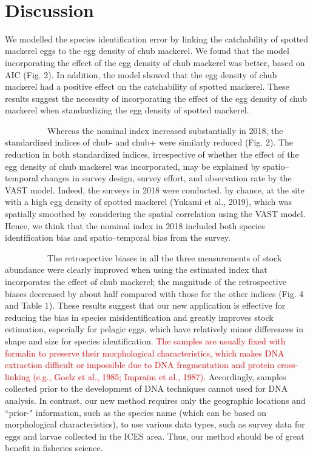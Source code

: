 \documentclass[12pt]{article}
\begin{document}
\begin{linenumbers}
\ \\
\section{Discussion}
We modelled the species identification error by linking the catchability of spotted mackerel eggs to the egg density of chub mackerel. We found that the model incorporating the effect of the egg density of chub mackerel was better, based on AIC (Fig. 2). In addition, the model showed that the egg density of chub mackerel had a positive effect on the catchability of spotted mackerel. These results suggest the necessity of incorporating the effect of the egg density of chub mackerel when standardizing the egg density of spotted mackerel.

\ \ \ \ \ \ \ \ \ \ 
Whereas the nominal index increased substantially in 2018, the standardized indices of chub- and chub+ were similarly reduced (Fig. 2). The reduction in both standardized indices, irrespective of whether the effect of the egg density of chub mackerel was incorporated, may be explained by spatio--temporal changes in survey design, survey effort, and observation rate by the VAST model. Indeed, the surveys in 2018 were conducted. by chance, at the site with a high egg density of spotted mackerel (Yukami et al., 2019), which was spatially smoothed by considering the spatial correlation using the VAST model. Hence, we think that the nominal index in 2018 included both species identification bias and spatio--temporal bias from the survey.

\ \ \ \ \ \ \ \ \ \ 
The retrospective biases in all the three measurements of stock abundance were clearly improved when using the estimated index that incorporates the effect of chub mackerel; the magnitude of the retrospective biases decreased by about half compared with those for the other indices (Fig. 4 and Table 1). These results suggest that our new application is effective for reducing the bias in species misidentification and greatly improves stock estimation, especially for pelagic eggs, which have relatively minor differences in shape and size for species identification. 
\textcolor{red}{The samples are usually fixed with formalin to preserve their morphological characteristics, which makes DNA extraction difficult or impossible due to DNA fragmentation and protein cross-linking (e.g., Goelz et al., 1985; Impraim et al., 1987).} Accordingly, samples collected prior to the development of DNA techniques cannot used for DNA analysis. In contrast, our new method requires only the geographic locations and ``prior-" information, such as the species name (which can be based on morphological characteristics), to use various data types, such as survey data for eggs and larvae collected in the ICES area. Thus, our method should be of great benefit in fisheries science.


\end{linenumbers}
\end{document}
